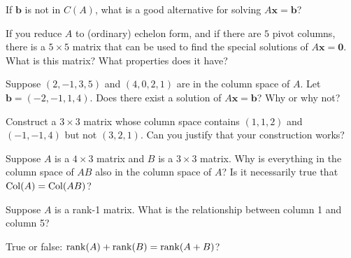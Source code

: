 \documentclass[minion]{homework}
\newcommand{\vb}{\mathbf{b}}
\newcommand{\vx}{\mathbf{x}}
\newcommand{\vzero}{\mathbf{0}}
\DeclareMathOperator{\Col}{\rm Col}
\DeclareMathOperator{\rank}{\rm rank}
\begin{document}
If $\vb$ is not in $C(A)$, what is a good alternative for solving
$A\vx =\vb$?  


If you reduce $A$ to (ordinary) echelon form, and if there are $5$ pivot
columns, there is a $5\times 5$ matrix that can be used to find
the special solutions of $A\vx=\vzero$.  What is this matrix?  
What properties does it have?

Suppose $(2,-1,3,5)$ and $(4,0,2,1)$ are in the column space of $A$.
Let $\vb=(-2,-1,1,4)$.  Does there exist a solution of $A\vx=\vb$?
Why or why not?

Construct a $3\times 3$ matrix whose column space contains $(1,1,2)$ and $(-1,-1,4)$
but not $(3,2,1)$.  Can you justify that your construction works?

Suppose $A$ is a $4\times 3$ matrix and $B$ is a $3\times 3$ matrix.
Why is everything in the column space of $AB$ also in the column space of $A$?
Is it necessarily true that $\Col(A)=\Col(AB)$?

Suppose $A$ is a rank-1 matrix.  What is the relationship between column 1 and column 5?

True or false:  $\rank(A)+\rank(B)=\rank(A+B)$?
\end{document}
